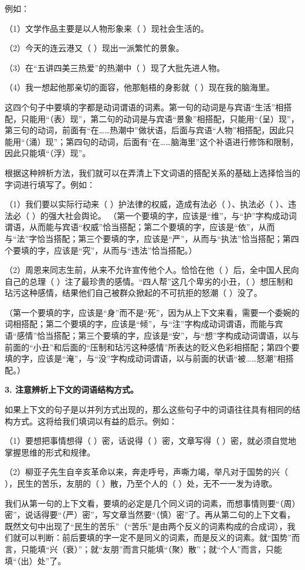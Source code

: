 例如：

（1）文学作品主要是以人物形象来（ ）现社会生活的。

（2）今天的连云港又（ ）现出一派繁忙的景象。

（3）在“五讲四美三热爱”的热潮中（ ）现了大批先进人物。

（4）我一想起他那亲切的面容，他那魁梧的身影就（ ）现在我的脑海里。

这四个句子中要填的字都是动词谓语的词素。第一句的动词是与宾语“生活”相搭配，只能用“（表）现”，第二句的动词是与宾语“景象”相搭配，只能用“（呈）现”，第三句的动词，前面有“在……热潮中”做状语，后面与宾语“人物”相搭配，因此只能用“（涌）现”；第四句的动词，后面有“在……脑海里”这个补语进行修饰和限制，因此只能填“（浮）现”。

根据这种辨析方法，我们就可以在弄清上下文词语的搭配关系的基础上选择恰当的字词进行填写了。例如：

（1）我们要以实际行动来（ ）护法律的权威，造成有法必（ ）、执法必（ ）、违法必（ ）的强大社会舆论。
（第一个要填的字，应该是“维”，与“护”字构成动词谓语，从而能与宾语“权威”恰当搭配；第二个要填的字，应该是“依”，从而与“法”字恰当搭配；第三个要填的字，应该是“严”，从而与“执法”恰当搭配；第四个要填的字，应该是“究”，从而与“违法”恰当搭配。）

（2）周恩来同志生前，从来不允许宣传他个人。恰恰在他（ ）后，全中国人民向自己的总理（ ）注了最珍贵的感情。“四人帮”这几个卑劣的小丑，（ ）想压制和玷污这种感情，结果他们自己被群众掀起的不可抗拒的怒潮（ ）没了。

（第一个要填的字，应该是“身”而不是“死”，因为从上下文来看，需要一个委婉的词相搭配；第二个要填的字，应该是“倾”，与“注”字构成动词谓语，而能与宾语“感情”恰当搭配；第三个要填的字，应该是“安”，与“想”字构成动词谓语，以与前面的“小丑”和后面的“压制和玷污这种感情”所表达的贬义色彩相搭配；第四个要填的字，应该是“淹”，与“没”字构成动词谓语，以与前面的状语“被……怒潮”相搭配。）

\textbf{3. 注意辨析上下文的词语结构方式。}

如果上下文的句子是以并列方式出现的，那么这些句子中的词语往往具有相同的结构方式。这将给我们填词以有益的启示。例如：

（1）要想把事情想得（ ）密，话说得（ ）密，文章写得（ ）密，就必须自觉地掌握思维的形式和规律。

（2）柳亚子先生自辛亥革命以来，奔走呼号，声嘶力竭，举凡对于国势的兴（ ），民生的苦乐，友朋的（ ）散，乃至个人的（ ）处，无不一一发为诗歌。

我们从第一句的上下文看，要填的必定是几个同义词的词素，而想事情则要“（周）密”，说话得要“（严）密”，写文章当然要“（慎）密”了。再从第二句的上下文看，既然文句中出现了“民生的苦乐”（“苦乐”是由两个反义的词素构成的合成词），我们就可以判断：前后要填的字一定不是同义的词素，而是反义的词素。就“国势”而言，只能填“兴（衰）”；就“友朋”而言只能填“（聚）散”；就“个人”而言，只能填“（出）处”了。

